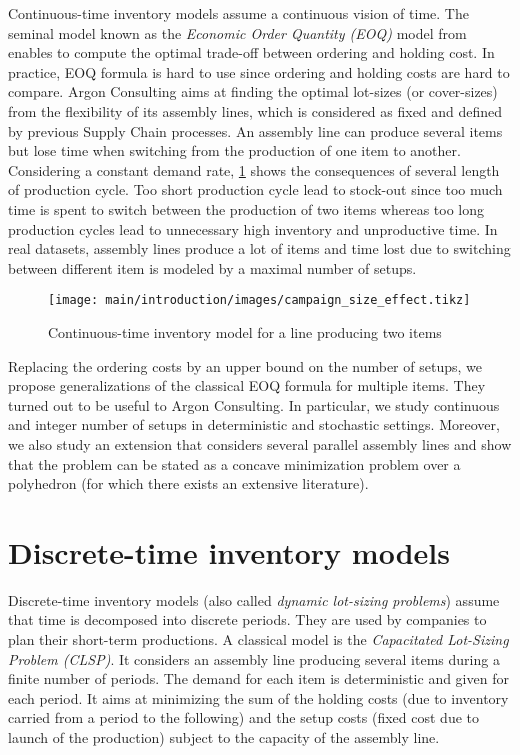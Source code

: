Continuous-time inventory models assume a continuous vision of time.
The seminal model known as the \emph{Economic Order Quantity (EOQ)} model from \citet{Harris1913} enables to compute the optimal trade-off between ordering and holding cost.
In practice, EOQ formula is hard to use since ordering and holding costs are hard to compare.
Argon Consulting aims at finding the optimal lot-sizes (or cover-sizes) from the flexibility of its assembly lines, which is considered as fixed and defined by previous Supply Chain processes.
An assembly line can produce several items but lose time when switching from the production of one item to another.
Considering a constant demand rate, \cref{fig:intro:en:continuous-time-inventory-model} shows the consequences of several length of production cycle.
Too short production cycle lead to stock-out since too much time is spent to switch between the production of two items whereas too long production cycles lead to unnecessary high inventory and unproductive time.
In real datasets, assembly lines produce a lot of items and time lost due to switching between different item is modeled by a maximal number of setups.


\begin{figure}[!ht]
  \centering
  \texttt{[image: main/introduction/images/campaign\_size\_effect.tikz]}
  \caption{Continuous-time inventory model for a line producing two items}
  \label{fig:intro:en:continuous-time-inventory-model}
\end{figure}


\medskip


Replacing the ordering costs by an upper bound on the number of setups, we propose generalizations of the classical EOQ formula for multiple items.
They turned out to be useful to Argon Consulting.
In particular, we study continuous and integer number of setups in deterministic and stochastic settings.
Moreover, we also study an extension that considers several parallel assembly lines and show that the problem can be stated as a concave minimization problem over a polyhedron (for which there exists an extensive literature).




\section{Discrete-time inventory models}
\label{sec:intro:en:discrete-time-inventory-models}


Discrete-time inventory models (also called \emph{dynamic lot-sizing problems}) assume that time is decomposed into discrete periods.
They are used by companies to plan their short-term productions.
A classical model is the \emph{Capacitated Lot-Sizing Problem (CLSP)}.
It considers an assembly line producing several items during a finite number of periods.
The demand for each item is deterministic and given for each period.
It aims at minimizing the sum of the holding costs (due to inventory carried from a period to the following) and the setup costs (fixed cost due to launch of the production) subject to the capacity of the assembly line.


